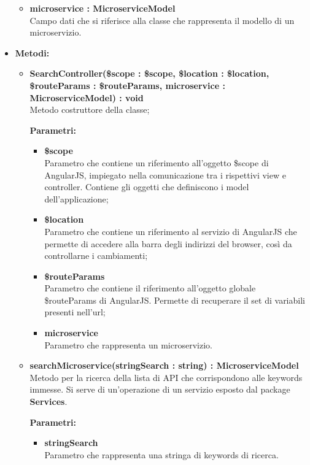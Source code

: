 \begin{itemize}
\begin{itemize}
			\item \textbf{microservice : MicroserviceModel }\\
			Campo dati che si riferisce alla classe che rappresenta il modello di un microservizio.
				
		\end{itemize}
	\item \textbf{Metodi:}
		\begin{itemize}
		
			\item \textbf{SearchController(\$scope : \$scope, \$location : \$location, \$routeParams : \$routeParams, microservice : MicroserviceModel) : void}\\
			Metodo costruttore della classe;
			\begin{description}
    			\item[\textbf{Parametri:}]
			\end{description}
			\begin{itemize}
				\item \textbf{\$scope}\\
				Parametro che contiene un riferimento all'oggetto \$scope di AngularJS, impiegato nella comunicazione tra i rispettivi view e controller. Contiene gli oggetti che definiscono i model dell'applicazione;
				
				\item \textbf{\$location}\\
				Parametro che contiene un riferimento al servizio di AngularJS che permette di accedere alla barra degli indirizzi del browser, così da controllarne i cambiamenti;
				
				\item \textbf{\$routeParams}\\
				Parametro che contiene il riferimento all'oggetto globale \$routeParams di AngularJS. Permette di recuperare il set di variabili presenti nell'url;
				
				\item \textbf{microservice}\\
				Parametro che rappresenta un microservizio.
			\end{itemize}
			
			\item \textbf{searchMicroservice(stringSearch : string) : MicroserviceModel}\\
			Metodo per la ricerca della lista di API che corrispondono alle keywords immesse. Si serve di un'operazione di un servizio esposto dal package \textbf{Services}.
			\begin{description}
    			\item[\textbf{Parametri:}]
			\end{description}
			\begin{itemize}
				\item \textbf{stringSearch}\\
				Parametro che rappresenta una stringa di keywords di ricerca.
			\end{itemize}
			

\end{itemize}
\end{itemize}
